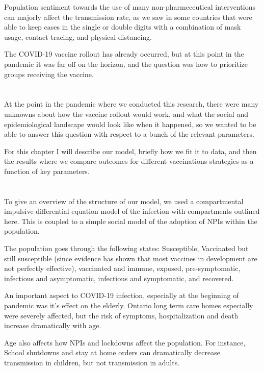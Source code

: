 \documentclass{article}
\begin{document}
Population sentiment towards the use of many non-pharmeceutical interventions can majorly affect the transmission rate, as we saw in some countries that were able to keep cases in the single or double digits with a combination of mask usage, contact tracing, and physical distancing. 

The COVID-19 vaccine rollout has already occurred, but at this point in the pandemic it was far off on the horizon, and the question was how to prioritize groups receiving the vaccine.


\section{}

At the point in the pandemic where we conducted this research, there were many unknowns about how the vaccine rollout would work, and what the social and epidemiological landscape would look like when it happened, so we wanted to be able to answer this question with respect to a bunch of the relevant parameters.


For this chapter I will describe our model, briefly how we fit it to data, and then the results where we compare outcomes for different vaccinations strategies as a function of key parameters.



\section{}

To give an overview of the structure of our model, we used a compartmental impulsive differential equation model of the infection with compartments outlined here. This is coupled to a simple social model of the adoption of NPIs within the population.

The population goes through the following states: Susceptible, Vaccinated but still susceptible (since evidence has shown that most vaccines in development are not perfectly effective), vaccinated and immune, exposed, pre-symptomatic, infectious and asymptomatic, infectious and symptomatic, and recovered. 


An important aspect to COVID-19 infection, especially at the beginning of pandemic was it's effect on the elderly. Ontario long term care homes especially were severely affected, but the risk of symptoms, hospitalization and death increase dramatically with age. 

Age also affects how NPIs and lockdowns affect the population. For instance, School shutdowns and stay at home orders can dramatically decrease transmission in children, but not transmission in adults. 
\end{document}
